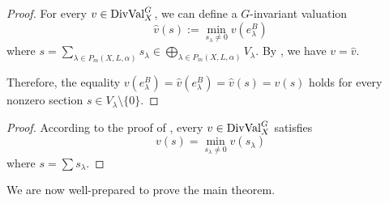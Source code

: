\begin{proof}
	For every $v \in \mathrm{DivVal}^G_X$, we can define a $G$-invariant valuation
	\begin{equation*}
		\hat{v}(s) := \min\limits_{s_\lambda \neq 0} v(e^B_\lambda)
	\end{equation*}
	where $s = \sum_{\lambda \in P_m(X, L, \alpha)} s_\lambda \in \bigoplus_{\lambda \in P_m(X, L, \alpha)} V_\lambda$. By , we have $v = \hat{v}$.

	Therefore, the equality $v(e^B_\lambda) = \hat{v}(e^B_\lambda) = \hat{v}(s) = v(s)$ holds for every nonzero section $s \in V_\lambda \setminus \{0\}$.
\end{proof}

\begin{proof}
	According to the proof of , every $v \in \mathrm{DivVal}^G_X$ satisfies
	\begin{equation*}
		v(s) = \min_{s_\lambda \neq 0} v(s_\lambda)
	\end{equation*}
	where $s = \sum s_\lambda$.
\end{proof}

We are now well-prepared to prove the main theorem.

